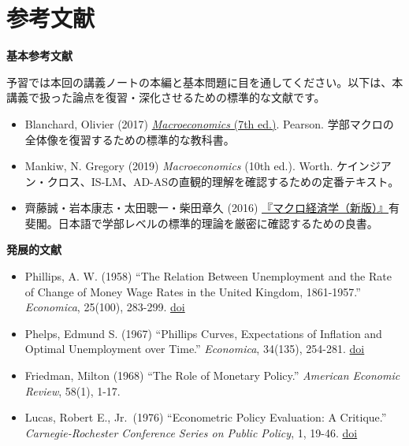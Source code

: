 \documentclass[
  japanese,
  lualatex,
  ja=standard,
  12pt,
  a4paper]{ltjsarticle}
\providecommand{\tightlist}{%
  \setlength{\itemsep}{0pt}\setlength{\parskip}{0pt}}
\begin{document}
\clearpage

\section{参考文献}\label{ux53c2ux8003ux6587ux732e}

\textbf{基本参考文献}

予習では本回の講義ノートの本編と基本問題に目を通してください。以下は、本講義で扱った論点を復習・深化させるための標準的な文献です。

\begin{itemize}
\tightlist
\item
  Blanchard, Olivier (2017)
  \href{https://www.pearson.com/en-us/subject-catalog/p/Blanchard-Macroeconomics-7th-Edition/P200000007659/9780133780581}{\emph{Macroeconomics}
  (7th ed.)}. Pearson.
  学部マクロの全体像を復習するための標準的な教科書。
\item
  Mankiw, N. Gregory (2019) \emph{Macroeconomics} (10th ed.). Worth.
  ケインジアン・クロス、IS-LM、AD-ASの直観的理解を確認するための定番テキスト。
\item
  齊藤誠・岩本康志・太田聰一・柴田章久 (2016)
  \href{https://www.yuhikaku.co.jp/books/detail/9784641053847}{『マクロ経済学（新版）』}有斐閣。日本語で学部レベルの標準的理論を厳密に確認するための良書。
\end{itemize}

\textbf{発展的文献}

\begin{itemize}
\tightlist
\item
  Phillips, A. W. (1958) ``The Relation Between Unemployment and the
  Rate of Change of Money Wage Rates in the United Kingdom, 1861-1957.''
  \emph{Economica}, 25(100), 283-299.
  \href{https://doi.org/10.1111/j.1468-0335.1958.tb00003.x}{doi}
\item
  Phelps, Edmund S. (1967) ``Phillips Curves, Expectations of Inflation
  and Optimal Unemployment over Time.'' \emph{Economica}, 34(135),
  254-281. \href{https://doi.org/10.2307/2552025}{doi}
\item
  Friedman, Milton (1968) ``The Role of Monetary Policy.''
  \emph{American Economic Review}, 58(1), 1-17.
\item
  Lucas, Robert E., Jr.~(1976) ``Econometric Policy Evaluation: A
  Critique.'' \emph{Carnegie-Rochester Conference Series on Public
  Policy}, 1, 19-46.
  \href{https://doi.org/10.1016/S0167-2231(76)80003-6}{doi}
\end{itemize}
\end{document}
